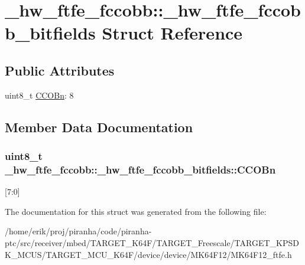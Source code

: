 \hypertarget{struct__hw__ftfe__fccobb_1_1__hw__ftfe__fccobb__bitfields}{}\section{\+\_\+hw\+\_\+ftfe\+\_\+fccobb\+:\+:\+\_\+hw\+\_\+ftfe\+\_\+fccobb\+\_\+bitfields Struct Reference}
\label{struct__hw__ftfe__fccobb_1_1__hw__ftfe__fccobb__bitfields}
\subsection*{Public Attributes}
\begin{DoxyCompactItemize}
\item 
uint8\+\_\+t \hyperlink{struct__hw__ftfe__fccobb_1_1__hw__ftfe__fccobb__bitfields_aecdb3f6c19524ba003ec69c79aa5df36}{C\+C\+O\+Bn}\+: 8
\end{DoxyCompactItemize}


\subsection{Member Data Documentation}
\subsubsection[{\texorpdfstring{C\+C\+O\+Bn}{CCOBn}}]{\setlength{\rightskip}{0pt plus 5cm}uint8\+\_\+t \+\_\+hw\+\_\+ftfe\+\_\+fccobb\+::\+\_\+hw\+\_\+ftfe\+\_\+fccobb\+\_\+bitfields\+::\+C\+C\+O\+Bn}\hypertarget{struct__hw__ftfe__fccobb_1_1__hw__ftfe__fccobb__bitfields_aecdb3f6c19524ba003ec69c79aa5df36}{}\label{struct__hw__ftfe__fccobb_1_1__hw__ftfe__fccobb__bitfields_aecdb3f6c19524ba003ec69c79aa5df36}
\mbox{[}7\+:0\mbox{]} 

The documentation for this struct was generated from the following file\+:\begin{DoxyCompactItemize}
\item 
/home/erik/proj/piranha/code/piranha-\/ptc/src/receiver/mbed/\+T\+A\+R\+G\+E\+T\+\_\+\+K64\+F/\+T\+A\+R\+G\+E\+T\+\_\+\+Freescale/\+T\+A\+R\+G\+E\+T\+\_\+\+K\+P\+S\+D\+K\+\_\+\+M\+C\+U\+S/\+T\+A\+R\+G\+E\+T\+\_\+\+M\+C\+U\+\_\+\+K64\+F/device/device/\+M\+K64\+F12/M\+K64\+F12\+\_\+ftfe.\+h\end{DoxyCompactItemize}
